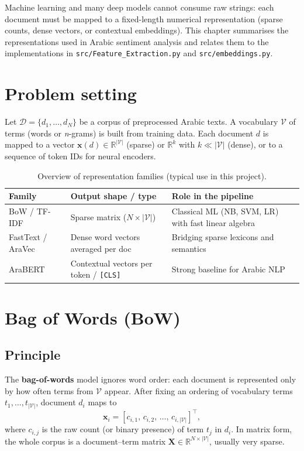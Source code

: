\documentclass[11pt,a4paper]{report}
\begin{document}
Machine learning and many deep models cannot consume raw strings: each document must be mapped to a fixed-length numerical representation (sparse counts, dense vectors, or contextual embeddings). This chapter summarises the representations used in Arabic sentiment analysis and relates them to the implementations in \texttt{src/Feature\_Extraction.py} and \texttt{src/embeddings.py}.

\section{Problem setting}

Let $\mathcal{D} = \{d_1,\ldots,d_N\}$ be a corpus of preprocessed Arabic texts. A vocabulary $\mathcal{V}$ of terms (words or \textit{n}-grams) is built from training data. Each document $d$ is mapped to a vector $\mathbf{x}(d) \in \mathbb{R}^{|\mathcal{V}|}$ (sparse) or $\mathbb{R}^{k}$ with $k \ll |\mathcal{V}|$ (dense), or to a sequence of token IDs for neural encoders.

\begin{table}[htbp]
    \centering
    \caption{Overview of representation families (typical use in this project).}
    \label{tab:repr-overview}
    \small
    \begin{tabular}{@{}p{2.6cm}p{4.2cm}p{5.8cm}@{}}
        \toprule
        \textbf{Family} & \textbf{Output shape / type} & \textbf{Role in the pipeline} \\
        \midrule
        BoW / TF-IDF & Sparse matrix ($N \times |\mathcal{V}|$) & Classical ML (NB, SVM, LR) with fast linear algebra \\
        FastText / AraVec & Dense word vectors averaged per doc & Bridging sparse lexicons and semantics \\
        AraBERT & Contextual vectors per token / \texttt{[CLS]} & Strong baseline for Arabic NLP \\
        \bottomrule
    \end{tabular}
\end{table}

\section{Bag of Words (BoW)}

\subsection{Principle}
The \textbf{bag-of-words} model ignores word order: each document is represented only by how often terms from $\mathcal{V}$ appear. After fixing an ordering of vocabulary terms $t_1,\ldots,t_{|\mathcal{V}|}$, document $d_i$ maps to
\[
    \mathbf{x}_i = [c_{i,1},\, c_{i,2},\, \ldots,\, c_{i,|\mathcal{V}|}]^{\top},
\]
where $c_{i,j}$ is the raw count (or binary presence) of term $t_j$ in $d_i$. In matrix form, the whole corpus is a document--term matrix $\mathbf{X} \in \mathbb{R}^{N \times |\mathcal{V}|}$, usually very sparse.
\end{document}
